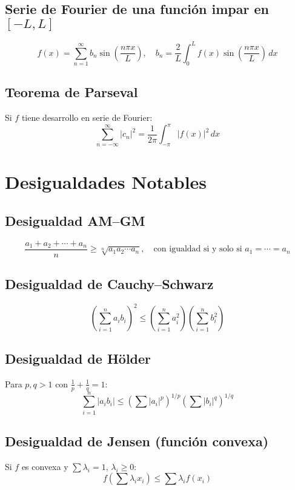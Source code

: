 \documentclass[12pt]{article}
\begin{document}
\subsection{Serie de Fourier de una función impar en \([-L, L]\)}
\[
f(x) = \sum_{n=1}^\infty b_n \sin \left( \frac{n\pi x}{L} \right),\quad b_n = \frac{2}{L} \int_0^L f(x) \sin \left( \frac{n\pi x}{L} \right)\,dx
\]

\subsection{Teorema de Parseval}
Si \(f\) tiene desarrollo en serie de Fourier:
\[
\sum_{n=-\infty}^\infty |c_n|^2 = \frac{1}{2\pi} \int_{-\pi}^{\pi} |f(x)|^2\,dx
\]










\newpage


\section{Desigualdades Notables}

\subsection{Desigualdad AM–GM}
\[
\frac{a_1 + a_2 + \cdots + a_n}{n} \geq \sqrt[n]{a_1 a_2 \cdots a_n},\quad \text{con igualdad si y solo si } a_1 = \cdots = a_n
\]

\subsection{Desigualdad de Cauchy–Schwarz}
\[
\left( \sum_{i=1}^n a_i b_i \right)^2 \leq \left( \sum_{i=1}^n a_i^2 \right) \left( \sum_{i=1}^n b_i^2 \right)
\]

\subsection{Desigualdad de Hölder}
Para \(p, q > 1\) con \(\frac{1}{p} + \frac{1}{q} = 1\):
\[
\sum_{i=1}^n |a_i b_i| \leq \left( \sum |a_i|^p \right)^{1/p} \left( \sum |b_i|^q \right)^{1/q}
\]

\subsection{Desigualdad de Jensen (función convexa)}
Si \(f\) es convexa y \(\sum \lambda_i = 1\), \(\lambda_i \geq 0\):
\[
f\left( \sum \lambda_i x_i \right) \leq \sum \lambda_i f(x_i)
\]
\end{document}
